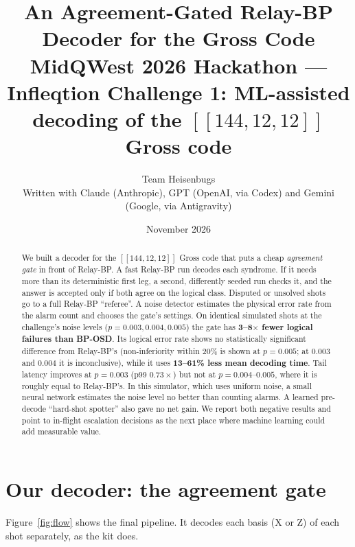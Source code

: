 \documentclass[11pt]{article}
\title{\textbf{An Agreement-Gated Relay-BP Decoder for the Gross Code}\\[4pt]
\large MidQWest 2026 Hackathon --- Infleqtion Challenge 1: ML-assisted decoding of the $[[144,12,12]]$ Gross code}
\author{Team Heisenbugs\\[2pt]\small Written with Claude (Anthropic), GPT (OpenAI, via Codex) and Gemini (Google, via Antigravity)}
\date{November 2026}
\begin{document}
\maketitle

\begin{abstract}
\noindent
We built a decoder for the $[[144,12,12]]$ Gross code that puts a cheap \emph{agreement gate} in front of
Relay-BP. A fast Relay-BP run decodes each syndrome. If it needs more than its deterministic first leg, a second, differently seeded
run checks it, and the answer is accepted only if both agree on the logical class. Disputed or unsolved shots go to a full Relay-BP ``referee''.
A noise detector estimates the physical error rate from the alarm count and chooses the gate's settings.
On identical simulated shots at the challenge's noise levels ($p = 0.003, 0.004, 0.005$) the gate has
\textbf{3--8$\times$ fewer logical failures than BP-OSD}. Its logical error rate shows no statistically significant difference from Relay-BP's (non-inferiority within 20\% is
shown at $p=0.005$; at $0.003$ and $0.004$ it is inconclusive), while it uses \textbf{13--61\% less mean decoding time}. Tail latency
improves at $p=0.003$ (p99 $0.73\times$) but not at $p=0.004$--$0.005$, where it is roughly equal to Relay-BP's. In this simulator, which
uses uniform noise, a small neural network estimates the noise level no better than counting alarms.
A learned pre-decode ``hard-shot spotter'' also gave no net gain. We report both negative results and point to in-flight
escalation decisions as the next place where machine learning could add measurable value.
\end{abstract}

\tableofcontents
\newpage



\section{Our decoder: the agreement gate}\label{sec:gate}

Figure~\ref{fig:flow} shows the final pipeline. It decodes each basis (X or Z) of each shot separately, as the kit does.
\end{document}
